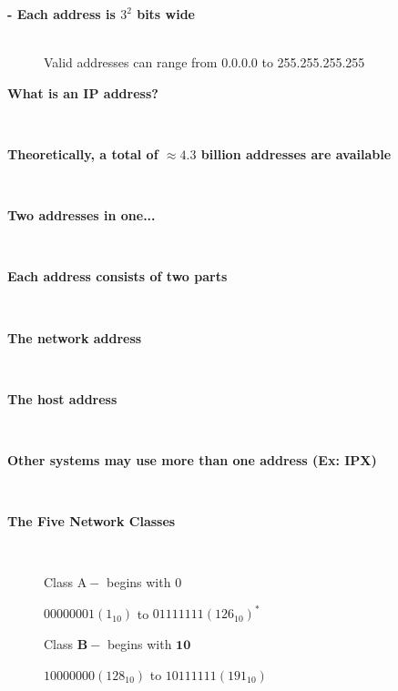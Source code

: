 \begin{description}
\os{\newpage}\item[{\rot\bf  - Each address is $3^{2}$ bits wide }]~\\[-3ex]

\bi
  \ite Valid addresses can range from 0.0.0.0 to 255.255.255.255
\ei




\item[{\rot\bf  What is an IP address?  }]~\\[-3ex]


\os{\newpage}\item[{\rot\bf  Theoretically, a total of $\approx 4.3$ billion addresses are available }]~\\[-3ex]




\os{\newpage}\item[{\rot\bf  Two addresses in one... }]~\\[-3ex]


\os{\newpage}\item[{\rot\bf  Each address consists of two parts }]~\\[-3ex]


\os{\newpage}\item[{\rot\bf  The network address }]~\\[-3ex]


\os{\newpage}\item[{\rot\bf  The host address }]~\\[-3ex]


\os{\newpage}\item[{\rot\bf  Other systems may use more than one address (Ex: IPX) }]~\\[-3ex]


\os{\newpage}\item[{\rot\bf  The Five Network Classes }]~\\[-3ex]

\begin{enumerate}
  \ite Class $\mathrm{A}-$ begins with 0
\end{enumerate}

\bi
  \ite $00000001\left(1_{10}\right)$ to $01111111\left(126_{10}\right)^{*}$
\ei

\begin{enumerate}
  \setcounter{enumi}{1}
  \ite Class $\mathbf{B}-$ begins with $\mathbf{1 0}$
\end{enumerate}

\bi
  \ite $10000000\left(128_{10}\right)$ to $10111111\left(191_{10}\right)$
\ei



\end{description}
